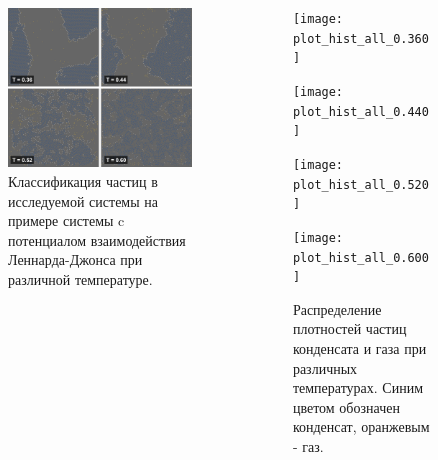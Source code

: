 \documentclass[pdf,hyperref={unicode}]{beamer}
\begin{document}
\begin{frame}
\transdissolve[duration=0.2]
\begin{columns}


\begin{column}{0.5\linewidth}
{
\begin{figure}[h]
\begin{center}
\includegraphics[width=\textwidth]{classification}
\caption{\tiny Классификация частиц в исследуемой системы на примере системы c потенциалом взаимодействия Леннарда-Джонса при различной температуре.}
\label{risClassExp}
\end{center}
\end{figure}
}
\end{column}

\begin{column}{0.65\linewidth}
{
\begin{figure}[h]
\begin{center}

\begin{minipage}[h]{0.47\linewidth}
\texttt{[image: plot\_hist\_all\_0.360]}
\end{minipage}
\begin{minipage}[h]{0.47\linewidth}
\texttt{[image: plot\_hist\_all\_0.440]}
\end{minipage}

\begin{minipage}[h]{0.47\linewidth}
\texttt{[image: plot\_hist\_all\_0.520]}
\end{minipage}
\begin{minipage}[h]{0.47\linewidth}
\texttt{[image: plot\_hist\_all\_0.600]}
\end{minipage}
\caption{\tiny Распределение плотностей частиц конденсата и газа при различных температурах. Синим цветом обозначен конденсат, оранжевым  - газ.}
\label{risRhoM}
\end{center}
\end{figure}
}
\end{column}

\end{columns}
\end{frame}
\end{document}
